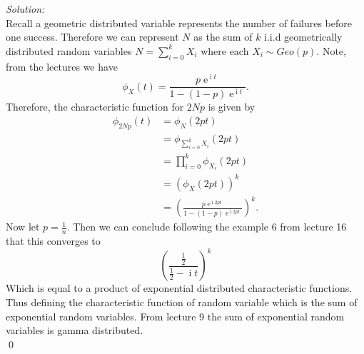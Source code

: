 \documentclass[10pt]{amsart}
\DeclareMathOperator{\E}{e}
\DeclareMathOperator{\I}{i}
\begin{document}
\noindent
\textit{Solution:} \\
Recall a geometric distributed variable represents the number of failures before one success.
Therefore we can represent $N$ as the sum of $k$ i.i.d geometrically distributed random variables
$N = \sum_{i=0}^k X_i$ where each $X_i \sim Geo(p).$
Note, from the lectures we have
$$
\phi_X(t) = \frac {p \E^{\I t}}{1 - (1-p)\E^{\I t}}.
$$
Therefore, the characteristic function for $2Np$ is given by
\begin{align*}
\phi_{2Np}(t)
	&= \phi_{N}(2pt) \\
	&= \phi_{\sum_{i=0}^k X_i}(2pt) \\
	&= \prod_{i=0}^k \phi_{X_i}(2pt) \\
	&= \left( \phi_{X}(2pt) \right)^k  \\
	&=  \left(\frac {p \E^{\I 2pt}}{1 - (1-p)\E^{\I 2pt}}\right)^k.
\end{align*}
Now let $p = \frac 1 n$.
Then we can conclude following the example 6 from lecture 16 that this converges to 
$$
\left(\frac {\frac 1 2}{\frac 1 2 - \I t}\right)^k
$$
Which is equal to a product of exponential distributed characteristic functions.
Thus defining the characteristic function of random variable which is the sum of exponential random variables.
From lecture 9 the sum of exponential random variables is gamma distributed. \\
\qed \\
\end{document}

